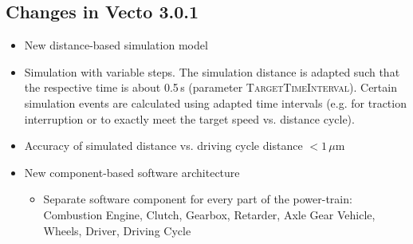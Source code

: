 \subsection{Changes in Vecto 3.0.1} %
\label{ssub:changes_in_vecto_3_0_1}

\begin{itemize}
	\item New distance-based simulation model
	\item Simulation with variable steps. The simulation distance is adapted such that the respective time is about 0.5\,s (parameter \textsc{TargetTimeInterval}). Certain simulation events are calculated using adapted time intervals (e.g. for traction interruption or to exactly meet the target speed vs. distance cycle).
	\item Accuracy of simulated distance vs. driving cycle distance $< 1\,\mu\textrm{m}$
	\item New component-based software architecture
	\begin{itemize}
		\item Separate software component for every part of the power-train:
		Combustion Engine,
		Clutch,
		Gearbox,
		Retarder,
		Axle Gear
		Vehicle,
		Wheels,
		Driver,
		Driving Cycle


\end{itemize}
\end{itemize}
